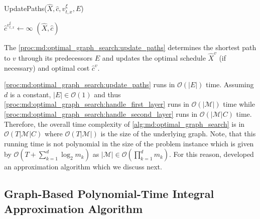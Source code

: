 \begin{function}
	\caption{UpdatePaths($\hat{X}, \hat{c}, v_{t,x}^{\xi}, E$)}\label{proc:md:optimal_graph_search:update_paths}
	$\hat{c}^{v_{t,x}^{\xi}} \gets \infty$\;
    \Return $(\hat{X}, \hat{c})$\;
\end{function}

The \autoref{proc:md:optimal_graph_search:update_paths} determines the shortest path to $v$ through its predecessors $E$ and updates the optimal schedule $\hat{X}^v$ (if necessary) and optimal cost $\hat{c}^v$.

\ref{proc:md:optimal_graph_search:update_paths} runs in $\mathcal{O}(|E|)$ time. Assuming $d$ is a constant, $|E| \in \mathcal{O}(1)$ and thus \ref{proc:md:optimal_graph_search:handle_first_layer} runs in $\mathcal{O}(|\mathcal{M}|)$ time while \ref{proc:md:optimal_graph_search:handle_second_layer} runs in $\mathcal{O}(|\mathcal{M}| C)$ time. Therefore, the overall time complexity of \ref{alg:md:optimal_graph_search} is in $\mathcal{O}(T |\mathcal{M}| C)$ where $\mathcal{O}(T |\mathcal{M}|)$ is the size of the underlying graph. Note, that this running time is not polynomial in the size of the problem instance which is given by $\mathcal{O}(T + \sum_{k=1}^d \log_2 m_k)$ as $|\mathcal{M}| \in \mathcal{O}(\prod_{k=1}^d m_k)$. For this reason, \citeauthor*{Albers2021_2} developed an approximation algorithm which we discuss next.

\subsection{Graph-Based Polynomial-Time Integral Approximation Algorithm}

